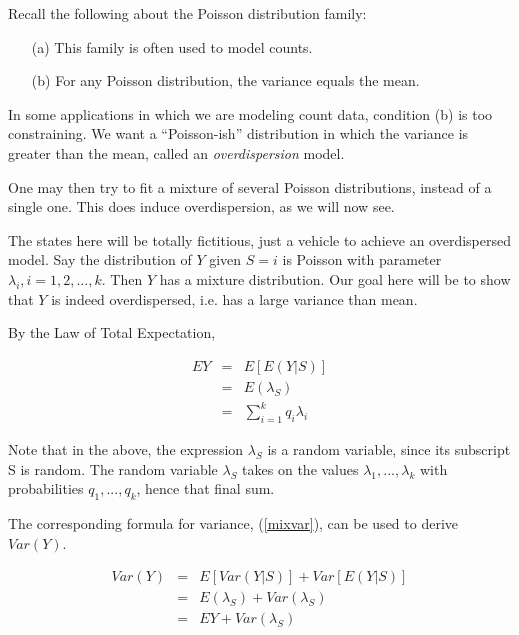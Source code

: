 \documentclass[11pt]{article}
\begin{document}
Recall the following about the Poisson distribution family:

\begin{itemize}

\item [(a)] This family is often used to model counts.

\item [(b)] For any Poisson distribution, the variance equals the mean.

\end{itemize}

In some applications in which we are modeling count data, condition (b)
is too constraining.  We want a ``Poisson-ish'' distribution in which
the variance is greater than the mean, called an {\it overdispersion}
model.

One may then try to fit a mixture of several Poisson distributions,
instead of a single one.  This does induce overdispersion, as we will
now see.  

The states here will be totally fictitious, just a vehicle to achieve an
overdispersed model.  Say the distribution of $Y$ given $S = i$ is
Poisson with parameter $\lambda_i, i = 1,2,...,k$.  Then $Y$ has a
mixture distribution.  Our goal here will be to show that $Y$ is indeed
overdispersed, i.e. has a large variance than mean.

By the Law of Total Expectation,

\begin{eqnarray}
\label{meanlamb}
EY &=& E[E(Y|S)] \\ 
&=& E(\lambda_S) \label{elambm} \\
&=& \sum_{i=1}^k q_i \lambda_i
\end{eqnarray}

Note that in the above, the expression $\lambda_S$ is a random variable,
since its subscript S is random.  The random variable $\lambda_S$ takes
on the values $\lambda_1,...,\lambda_k$ with probabilities
$q_1,...,q_k$, hence that final sum.

The corresponding formula for variance, (\ref{mixvar}), can be used to
derive $Var(Y)$.

\begin{eqnarray}
Var(Y) &=& E[Var(Y|S)] + Var[E(Y|S)] \\ 
&=& E(\lambda_S) + Var(\lambda_S) \label{thislast} \\
&=& EY + Var(\lambda_S) \label{thislast} \\
\end{eqnarray}
\end{document}
